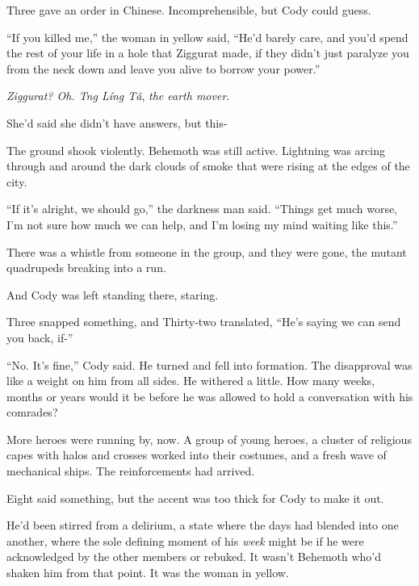 Three gave an order in Chinese.  Incomprehensible, but Cody could guess.



``If you killed me,'' the woman in yellow said, ``He'd barely care, and you'd spend the rest of your life in a hole that Ziggurat made, if they didn't just paralyze you from the neck down and leave you alive to borrow your power.''



\emph{Ziggurat?  Oh.  Tng L\'{i}ng T\v{a}}, \emph{the earth mover}.



She'd said she didn't have answers, but this-



The ground shook violently.  Behemoth was still active.  Lightning was arcing through and around the dark clouds of smoke that were rising at the edges of the city.



``If it's alright, we should go,'' the darkness man said.  ``Things get much worse, I'm not sure how much we can help, and I'm losing my mind waiting like this.''



There was a whistle from someone in the group, and they were gone, the mutant quadrupeds breaking into a run.



And Cody was left standing there, staring.



Three snapped something, and Thirty-two translated, ``He's saying we can send you back, if-''



``No.  It's fine,'' Cody said.  He turned and fell into formation.  The disapproval was like a weight on him from all sides.  He withered a little.  How many weeks, months or years would it be before he was allowed to hold a conversation with his comrades?



More heroes were running by, now.  A group of young heroes, a cluster of religious capes with halos and crosses worked into their costumes, and a fresh wave of mechanical ships.  The reinforcements had arrived.



Eight said something, but the accent was too thick for Cody to make it out.



He'd been stirred from a delirium, a state where the days had blended into one another, where the sole defining moment of his \emph{week} might be if he were acknowledged by the other members or rebuked.  It wasn't Behemoth who'd shaken him from that point.  It was the woman in yellow.



